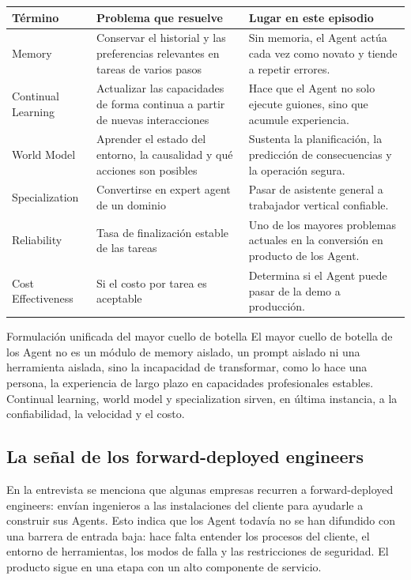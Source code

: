 \documentclass[a4paper]{article}
\begin{document}
\noindent\begin{tabularx}{\textwidth}{p{}p{}X}
\toprule
Término & Problema que resuelve & Lugar en este episodio \\
\midrule
Memory & Conservar el historial y las preferencias relevantes en tareas de varios pasos & Sin memoria, el Agent actúa cada vez como novato y tiende a repetir errores. \\
Continual Learning & Actualizar las capacidades de forma continua a partir de nuevas interacciones & Hace que el Agent no solo ejecute guiones, sino que acumule experiencia. \\
World Model & Aprender el estado del entorno, la causalidad y qué acciones son posibles & Sustenta la planificación, la predicción de consecuencias y la operación segura. \\
Specialization & Convertirse en expert agent de un dominio & Pasar de asistente general a trabajador vertical confiable. \\
Reliability & Tasa de finalización estable de las tareas & Uno de los mayores problemas actuales en la conversión en producto de los Agent. \\
Cost Effectiveness & Si el costo por tarea es aceptable & Determina si el Agent puede pasar de la demo a producción. \\
\bottomrule
\end{tabularx}

\begin{importantbox}{Formulación unificada del mayor cuello de botella}
El mayor cuello de botella de los Agent no es un módulo de memory aislado, un prompt aislado ni una herramienta aislada, sino la incapacidad de transformar, como lo hace una persona, la experiencia de largo plazo en capacidades profesionales estables. Continual learning, world model y specialization sirven, en última instancia, a la confiabilidad, la velocidad y el costo.
\end{importantbox}

\subsection{La señal de los forward-deployed engineers}

En la entrevista se menciona que algunas empresas recurren a forward-deployed engineers: envían ingenieros a las instalaciones del cliente para ayudarle a construir sus Agents. Esto indica que los Agent todavía no se han difundido con una barrera de entrada baja: hace falta entender los procesos del cliente, el entorno de herramientas, los modos de falla y las restricciones de seguridad. El producto sigue en una etapa con un alto componente de servicio.
\end{document}
